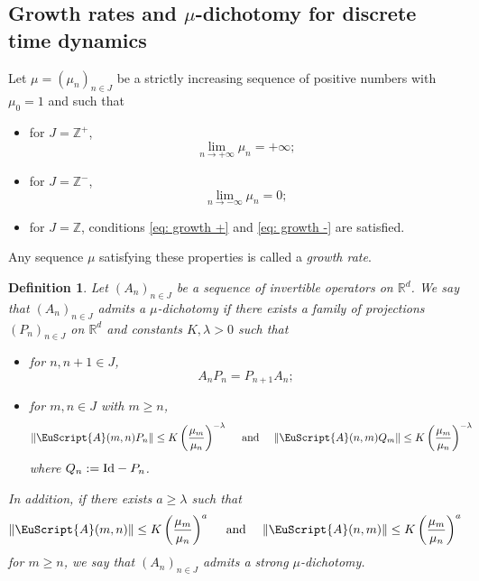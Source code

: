 \documentclass[reqno, a4paper, 10pt]{amsart}
\theoremstyle{plain}
\numberwithin{equation}{section}
\newtheorem{definition}{Definition}
\theoremstyle{remark}
\def\cA{\EuScript{A}}
\def\R{\mathbb{R}}
\def\Id{\text{\rm Id}}
\def\Z{\mathbb{Z}}
\begin{document}
\subsection{Growth rates and $\mu$-dichotomy for discrete time dynamics}
Let $ \mu =(\mu_n)_{n\in J}$ be a strictly increasing sequence of positive numbers with $\mu_0=1$ and such that 
\begin{itemize}
\item for $J=\Z^{+}$,
\begin{equation}\label{eq: growth +}
     \lim_{n\to +\infty}\mu_n=+\infty;
     \end{equation}
\item for $J=\Z ^-$,
\begin{equation}\label{eq: growth -}
     \lim_{n\to -\infty}\mu_n=0;
     \end{equation}
\item for $J=\Z$, conditions \eqref{eq: growth +} and \eqref{eq: growth -} are satisfied.
\end{itemize}
Any sequence $\mu$ satisfying these properties is called a \emph{growth rate}.

\begin{definition}\label{def: mu dichot}
Let $(A_n)_{n\in J}$ be a sequence of invertible operators on $\R^d$. We say that $(A_n)_{n\in J}$ admits a \emph{$\mu$-dichotomy} if there exists a family of projections $(P_n)_{n\in J}$ on $\R^d$ and constants $K,\lambda >0$ such that
\begin{itemize}
\item  for $n,n+1\in J$,
\begin{equation}\label{pro}
A_nP_n=P_{n+1}A_n;
\end{equation}
\item for $m,n\in J$ with $m\geq n$,
\begin{equation}\label{pd1}
\|\cA(m,n)P_n\|\leq K \left(\frac{\mu_m}{\mu_n}\right)^{-\lambda} \quad \text{ and }\quad 
\|\cA(n,m)Q_m\|\leq K \left(\frac{\mu_m}{\mu_n}\right)^{-\lambda} \quad 
\end{equation}
where $Q_n:=\Id -P_n$.
\end{itemize}
In addition, if there exists $a\geq \lambda$ such that
\begin{equation}\label{bg}
\|\cA(m,n)\|\leq K \left(\frac{\mu_m}{\mu_n}\right)^{a} \quad \text{ and } \quad 
\|\cA(n,m)\|\leq K \left(\frac{\mu_m}{\mu_n}\right)^{a} 
\end{equation}
for $m\geq n$, we say that $(A_n)_{n\in J}$ admits a \emph{strong $\mu$-dichotomy}.
\end{definition}
\end{document}
